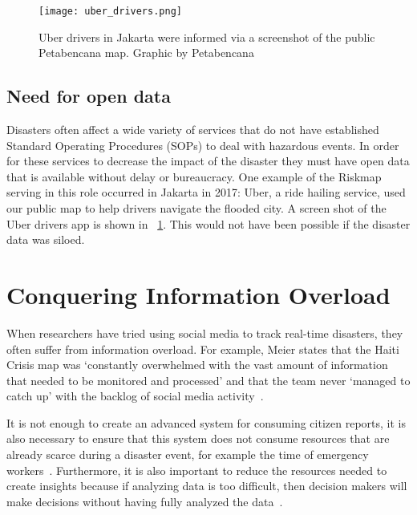   \begin{figure}[h]
    \centering
    \captionsetup{justification=centering}
    \texttt{[image: uber\_drivers.png]}
    \caption{Uber drivers in Jakarta were informed via a screenshot of the
    public Petabencana map. Graphic by Petabencana}\label{fig:uber}
  \end{figure}

  \subsection{Need for open data}
  Disasters often affect a wide variety of services that do not have established
  Standard Operating Procedures (SOPs) to deal with hazardous events. In order
  for these services to decrease the impact of the disaster they must have open
  data that is available without delay or bureaucracy. One example of the
  Riskmap serving in this role occurred in Jakarta in 2017: Uber, a ride hailing
  service, used our public map to help drivers navigate the flooded city. A
  screen shot of the Uber drivers app is shown in
  \figureautorefname~\ref{fig:uber}. This would not have been possible if the
  disaster data was siloed.
    
\section{Conquering Information Overload} 
  When researchers have tried using social media to track real-time disasters,
  they often suffer from information overload. For example, Meier states that
  the Haiti Crisis map was `constantly overwhelmed with the vast amount of
  information that needed to be monitored and processed' and that the team never
  `managed to catch up' with the backlog of social media
  activity~\cite{meierDigitalHumanitariansHow2015}.
  
  It is not enough to create an advanced system for consuming citizen reports,
  it is also necessary to ensure that this system does not consume resources
  that are already scarce during a disaster event, for example the time of
  emergency workers~\cite{aminDataNaturalDisasters2008}. Furthermore, it is also
  important to reduce the resources needed to create insights because if
  analyzing data is too difficult, then decision makers will make decisions
  without having fully analyzed the
  data~\cite{quarantelliUrbanVulnerabilityDisasters2003}.
  
